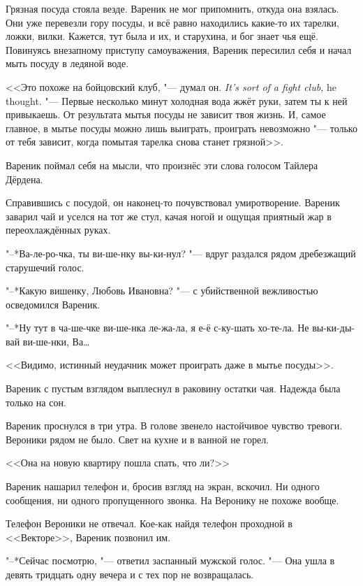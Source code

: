 Грязная посуда стояла везде.
Вареник не мог припомнить, откуда она взялась.
Они уже перевезли гору посуды, и всё равно находились какие-то их тарелки, ложки, вилки.
Кажется, тут была и их, и старухина, и бог знает чья ещё.
Повинуясь внезапному приступу самоуважения, Вареник пересилил себя и начал мыть посуду в ледяной воде.

{<<Это похоже на бойцовский клуб, "--- думал он.}
{\textit{It's sort of a fight club,} he thought.}
"--- Первые несколько минут холодная вода жжёт руки, затем ты к ней привыкаешь.
От результата мытья посуды не зависит твоя жизнь.
И, самое главное, в мытье посуды можно лишь выиграть, проиграть невозможно "--- только от тебя зависит, когда помытая тарелка снова станет грязной>>.

Вареник поймал себя на мысли, что произнёс эти слова голосом Тайлера Дёрдена.

Справившись с посудой, он наконец-то почувствовал умиротворение.
Вареник заварил чай и уселся на тот же стул, качая ногой и ощущая приятный жар в переохлаждённых руках.

"--*Ва-ле-ро-чка, ты ви-ше-нку вы-ки-нул? "--- вдруг раздался рядом дребезжащий старушечий голос.

"--*Какую вишенку, Любовь Ивановна? "--- с убийственной вежливостью осведомился Вареник.

"--*Ну тут в ча-ше-чке ви-ше-нка ле-жа-ла, я е-ё с-ку-шать хо-те-ла.
Не вы-ки-ды-вай ви-ше-нки, Ва\dots{}

<<Видимо, истинный неудачник может проиграть даже в мытье посуды>>.

Вареник с пустым взглядом выплеснул в раковину остатки чая.
Надежда была только на сон.

\asterism

\label{Mon_2012_06_11}

Вареник проснулся в три утра.
В голове звенело настойчивое чувство тревоги.
Вероники рядом не было.
Свет на кухне и в ванной не горел.

<<Она на новую квартиру пошла спать, что ли?>>

Вареник нашарил телефон и, бросив взгляд на экран, вскочил.
Ни одного сообщения, ни одного пропущенного звонка.
На Веронику не похоже вообще.

Телефон Вероники не отвечал.
Кое-как найдя телефон проходной в <<Векторе>>, Вареник позвонил им.

"--*Сейчас посмотрю, "--- ответил заспанный мужской голос.
"--- Она ушла в девять тридцать одну вечера и с тех пор не возвращалась.

